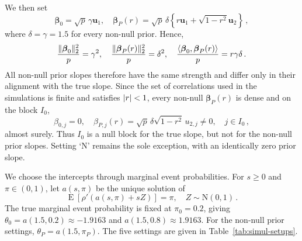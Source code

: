 \documentclass{article}
\makeatletter
\DeclareMathOperator{\expect}{E}
\theoremstyle{definition}
\newcommand{\vnorm}[1]{%
	\ensuremath{%
		\if@display
		\left\| #1 \right\|
		\else
		\| #1 \|
		\fi
	}%
}
\newcommand{\abs}[1]{%
	\ensuremath{%
		\if@display
		\left| #1 \right|
		\else
		\lvert #1 \rvert
		\fi
	}%
}
\newcommand*{\bb}{\boldsymbol}
\def\bu{\bb{u}}
\def\bbeta{\bb{\beta}}
\makeatother
\begin{document}
\begin{bibunit}
We then set
$$
    \bbeta_0
    =
    \sqrt p\,\gamma\bu_1,
    \quad
    \bbeta_P(r)
    =
    \sqrt p\,\delta
    \left\{
        r\bu_1+\sqrt{1-r^2}\bu_2
    \right\}\,,
$$
where $\delta=\gamma=1.5$ for every non-null prior. Hence,
$$
    \frac{\vnorm{\bbeta_0}_2^2}{p}=\gamma^2,
    \quad
    \frac{\vnorm{\bbeta_P(r)}_2^2}{p}=\delta^2,
    \quad
    \frac{\langle\bbeta_0,\bbeta_P(r)\rangle}{p}=r\gamma\delta\,.
$$
All non-null prior slopes therefore have the same strength and differ only in
their alignment with the true slope. Since the set of correlations used in
the simulations is finite and satisfies $\abs{r}<1$, every non-null
$\bbeta_P(r)$ is dense and on the block $I_0$,
$$
    \beta_{0,j}=0,
    \quad
    \beta_{P,j}(r)
    =
    \sqrt p\,\delta\sqrt{1-r^2}\,u_{2,j}
    \neq0,
    \quad
    j\in I_0\,,
$$
almost surely. Thus $I_0$ is a null block for the true slope, but not for the
non-null prior slopes. 
Setting `$\mathrm{N}$' remains the sole exception, with an
identically zero prior slope.

We choose the intercepts through marginal event probabilities. For
$s\geq0$ and $\pi\in(0,1)$, let $a(s,\pi)$ be the unique solution of
$$
    \expect\left[
        \rho'(a(s,\pi)+sZ)
    \right]
    =
    \pi,
    \quad
    Z\sim\mathrm N(0,1)\,.
$$
The true marginal event probability is fixed at $\pi_0=0.2$, giving
$
    \theta_0
    =
    a(1.5,0.2)
    \approx
    -1.9163
$ and $a(1.5,0.8)\approx1.9163$. For the non-null prior settings,
$\theta_P=a(1.5,\pi_P)$. The five settings are given in
Table~\ref{tab:simul-setups}.







\end{bibunit}
\end{document}
